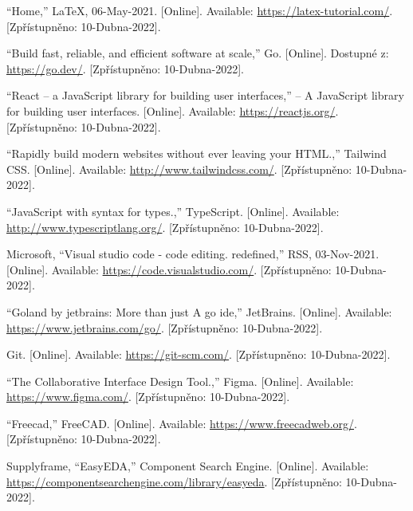 \documentclass[12pt,a4paper]{article}
\begin{document}
\begin{thebibliography}{9}
	\vspace*{-1.5cm}
	“Home,” LaTeX, 06-May-2021. [Online]. Available: \href{https://latex-tutorial.com/}{https://latex-tutorial.com/}. [Zpřístupněno: 10-Dubna-2022]. 

	“Build fast, reliable, and efficient software at scale,” Go. [Online]. Dostupné z: \href{https://go.dev/}{https://go.dev/}. [Zpřístupněno: 10-Dubna-2022]. 

	“React – a JavaScript library for building user interfaces,” – A JavaScript library for building user interfaces. [Online]. Available: \href{https://reactjs.org/}{https://reactjs.org/}. [Zpřístupněno: 10-Dubna-2022]. 

	“Rapidly build modern websites without ever leaving your HTML.,” Tailwind CSS. [Online]. Available: \href{http://www.tailwindcss.com/}{http://www.tailwindcss.com/}. [Zpřístupněno: 10-Dubna-2022]. 

	“JavaScript with syntax for types.,” TypeScript. [Online]. Available: \href{http://www.typescriptlang.org/}{http://www.typescriptlang.org/}. [Zpřístupněno: 10-Dubna-2022]. 

	Microsoft, “Visual studio code - code editing. redefined,” RSS, 03-Nov-2021. [Online]. Available: \href{https://code.visualstudio.com/}{https://code.visualstudio.com/}. [Zpřístupněno: 10-Dubna-2022]. 

	“Goland by jetbrains: More than just A go ide,” JetBrains. [Online]. Available: \href{https://www.jetbrains.com/go/}{https://www.jetbrains.com/go/}. [Zpřístupněno: 10-Dubna-2022]. 

	Git. [Online]. Available: \href{https://git-scm.com/}{https://git-scm.com/}. [Zpřístupněno: 10-Dubna-2022]. 

	“The Collaborative Interface Design Tool.,” Figma. [Online]. Available: \href{https://www.figma.com/}{https://www.figma.com/}. [Zpřístupněno: 10-Dubna-2022]. 

	“Freecad,” FreeCAD. [Online]. Available: \href{https://www.freecadweb.org/}{https://www.freecadweb.org/}. [Zpřístupněno: 10-Dubna-2022]. 

	Supplyframe, “EasyEDA,” Component Search Engine. [Online]. Available: \href{https://componentsearchengine.com/library/easyeda}{https://componentsearchengine.com/library/easyeda}. [Zpřístupněno: 10-Dubna-2022]. 
\end{thebibliography}
\end{document}
